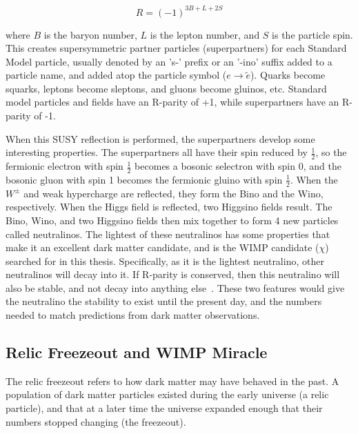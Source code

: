 \begin{equation}
  R = (-1)^{3B+L+2S}
\end{equation}

where $B$ is the baryon number, $L$ is the lepton number, and $S$ is the particle spin.
This creates supersymmetric partner particles (superpartners) for each Standard Model particle, usually denoted by an 's-' prefix or an '-ino' suffix added to a particle name, and \nicetilde{} added atop the particle symbol ($e \rightarrow \tilde{e}$).
Quarks become squarks, leptons become sleptons, and gluons become gluinos, etc.
Standard model particles and fields have an R-parity of +1, while superpartners have an R-parity of -1.

When this SUSY reflection is performed, the superpartners develop some interesting properties.
The superpartners all have their spin reduced by $\frac{1}{2}$, so the fermionic electron with spin $\frac{1}{2}$ becomes a bosonic selectron with spin $0$, and the bosonic gluon with spin 1 becomes the fermionic gluino with spin $\frac{1}{2}$.
When the $W^{\pm}$  and weak hypercharge are reflected, they form the Bino and the Wino, respectively.
When the Higgs field is reflected, two Higgsino fields result.
The Bino, Wino, and two Higgsino fields then mix together to form 4 new particles called neutralinos.
The lightest of these neutralinos has some properties that make it an excellent dark matter candidate, and is the WIMP candidate ($\chi$) searched for in this thesis.
Specifically, as it is the lightest neutralino, other neutralinos will decay into it.
If R-parity is conserved, then this neutralino will also be stable, and not decay into anything else~\cite{neutralino1,neutralino2,neutralino3}.
These two features would give the neutralino the stability to exist until the present day, and the numbers needed to match predictions from dark matter observations.

\subsection{Relic Freezeout and WIMP Miracle}

The relic freezeout refers to how dark matter may have behaved in the past.
A population of dark matter particles existed during the early universe (a relic particle), and that at a later time the universe expanded enough that their numbers stopped changing (the freezeout).

